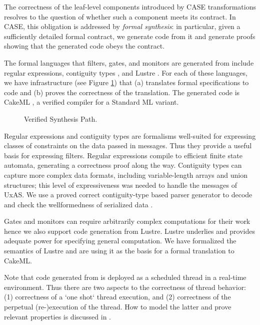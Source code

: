 The correctness of the leaf-level components introduced by CASE
transformations resolves to the question of whether such a component
meets its \agree{} contract. In CASE, this obligation is addressed by
\emph{formal synthesis}: in particular, given a sufficiently detailed
formal contract, we generate code from it and generate proofs showing
that the generated code obeys the contract.

The formal languages that filters, gates, and monitors are generated
from include regular expressions, contiguity types
\cite{contiguity-types}, and Lustre \cite{lustre}. For each of these
languages, we have infrastructure (see Figure \ref{fig:synthesis})
that (a) translates formal specifications to code and (b) proves the
correctness of the translation. The generated code is CakeML
\cite{cakeml}, a verified compiler for a Standard ML variant.

\begin{figure}[h]
\begin{center}
\end{center}
\caption{Verified Synthesis Path.\label{fig:synthesis}}
\end{figure}

Regular expressions and contiguity types are formalisms well-suited
for expressing classes of constraints on the data passed in
messages. Thus they provide a useful basis for expressing
filters. Regular expressions compile to efficient finite state
automata, generating a correctness proof along the
way\cite{case-verified-filter}. Contiguity types can capture more
complex data formats, including variable-length arrays and union
structures; this level of expressiveness was needed to handle the
messages of UxAS. We use a proved correct contiguity-type based parser
generator to decode and check the wellformedness of serialized data
\cite{contiguity-types}.

Gates and monitors can require arbitrarily complex computations for
their work hence we also support code generation from Lustre. Lustre
underlies \agree{} and provides adequate power for specifying general
computation. We have formalized the semantics of Lustre and are using
it as the basis for a formal translation to CakeML.

Note that code generated from \splat{} is deployed as a scheduled
thread in a real-time environment. Thus there are two aspects to the
correctness of thread behavior: (1) correctness of a `one shot` thread
execution, and (2) correctness of the perpetual (re-)execution of the
thread. How to model the latter and prove relevant properties is
discussed in \cite{johannes:repeat}.
